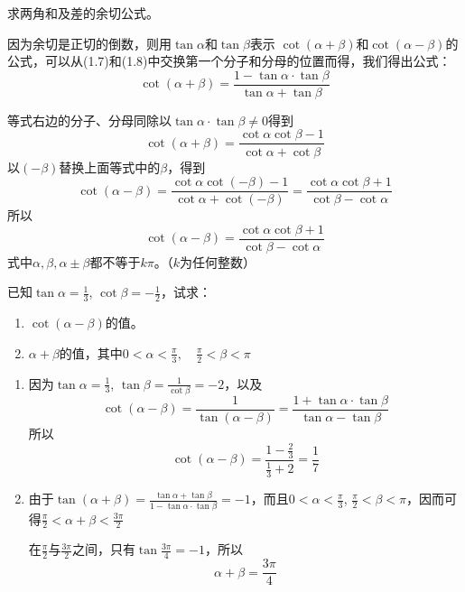 \begin{example}
求两角和及差的余切公式。
\end{example}

\begin{solution}
 因为余切是正切的倒数，则用$\tan\alpha$和$\tan\beta$表示
    $\cot (\alpha+\beta)$和$\cot(\alpha-\beta)$的公式，可以从(1.7)和(1.8)中交换第一个分子和分母的位置而得，我们得出公式：
\[    \cot (\alpha+\beta)=\frac{1-\tan\alpha\cdot\tan \beta}{\tan\alpha+\tan \beta}\]
   
等式右边的分子、分母同除以$\tan\alpha\cdot\tan\beta\ne 0$得到 
\begin{equation}
    \cot(\alpha+\beta)=\frac{\cot\alpha\cot\beta-1}{\cot\alpha+\cot\beta}
\end{equation}
以$(-\beta)$替换上面等式中的$\beta$，得到
\[
    \cot(\alpha-\beta)=\frac{\cot\alpha\cot(-\beta)-1}{\cot\alpha+\cot(-\beta)}=\frac{\cot\alpha\cot\beta+1}{\cot\beta-\cot\alpha}
\]
所以
\begin{equation}
    \cot(\alpha-\beta)=\frac{\cot\alpha\cot\beta+1}{\cot\beta-\cot\alpha}  
\end{equation}
式中$\alpha,\beta,\alpha\pm\beta$都不等于$k\pi$。（$k$为任何整数）
\end{solution}

\begin{example}
已知$\tan\alpha=\frac{1}{3}$, $\cot\beta=-\frac{1}{2}$，试求：
\begin{enumerate}
    \item $\cot(\alpha-\beta)$的值。
    \item $\alpha+\beta$的值，其中$0<\alpha<\frac{\pi}{3},\quad \frac{\pi}{2}<\beta<\pi$
\end{enumerate}
\end{example}

\begin{solution}
\begin{enumerate}
    \item 因为$\tan\alpha=\frac{1}{3}$, $\tan\beta=\frac{1}{\cot\beta}=-2$，以及
\[\cot(\alpha-\beta)=\frac{1}{\tan(\alpha-\beta)}=\frac{1+\tan\alpha\cdot \tan\beta}{\tan\alpha-\tan\beta}\]
所以
\[\cot(\alpha-\beta)=\frac{1-\frac{2}{3}}{\frac{1}{3}+2}=\frac{1}{7} \]

\item 由于$\tan(\alpha+\beta)=\frac{\tan \alpha+\tan\beta}{1-\tan\alpha\cdot \tan\beta}=-1$，而且$0<\alpha<\frac{\pi}{3}$, $\frac{\pi}{2}<\beta<\pi$，因而可得$\frac{\pi}{2}<\alpha+\beta<\frac{3\pi}{2}$

在$\frac{\pi}{2}$与$\frac{3\pi}{2}$之间，只有$\tan\frac{3\pi}{4}=-1$，所以
\[\alpha+\beta =\frac{3\pi}{4}\]
\end{enumerate}    
\end{solution}

